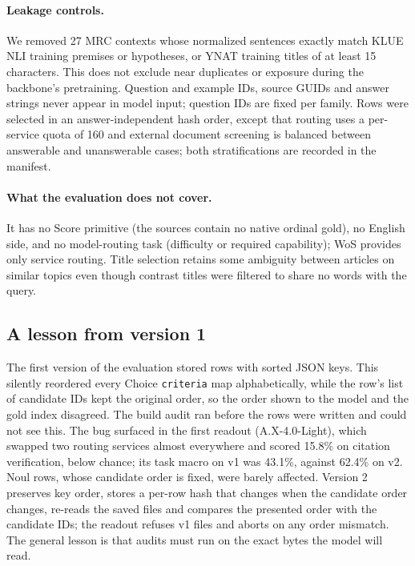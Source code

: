 \paragraph{Leakage controls.}
We removed 27 MRC contexts whose normalized sentences exactly match KLUE NLI training
premises or hypotheses, or YNAT training titles of at least 15 characters. This does not
exclude near duplicates or exposure during the backbone's pretraining. Question and example
IDs, source GUIDs and answer strings never appear in model input; question IDs are fixed per
family. Rows were selected in an answer-independent hash order, except that routing uses a
per-service quota of 160 and external document screening is balanced between answerable and
unanswerable cases; both stratifications are recorded in the manifest.

\paragraph{What the evaluation does not cover.}
It has no Score primitive (the sources contain no native ordinal gold), no English side, and
no model-routing task (difficulty or required capability); WoS provides only service
routing. Title selection retains some ambiguity between articles on similar topics even
though contrast titles were filtered to share no words with the query.

\subsection{A lesson from version 1}
\label{sec:v1bug}

The first version of the evaluation stored rows with sorted JSON keys. This silently
reordered every Choice \texttt{criteria} map alphabetically, while the row's list of
candidate IDs kept the original order, so the order shown to the model and the gold index
disagreed. The build audit ran before the rows were written and could not see this. The bug
surfaced in the first readout (A.X-4.0-Light), which swapped two routing services almost
everywhere and scored 15.8\% on citation verification, below chance; its task macro on v1
was 43.1\%, against 62.4\% on v2. Noul rows, whose candidate order is fixed, were barely
affected. Version 2 preserves key order, stores a per-row hash that changes when the
candidate order changes, re-reads the saved files and compares the presented order with the
candidate IDs; the readout refuses v1 files and aborts on any order mismatch. The general
lesson is that audits must run on the exact bytes the model will read.

